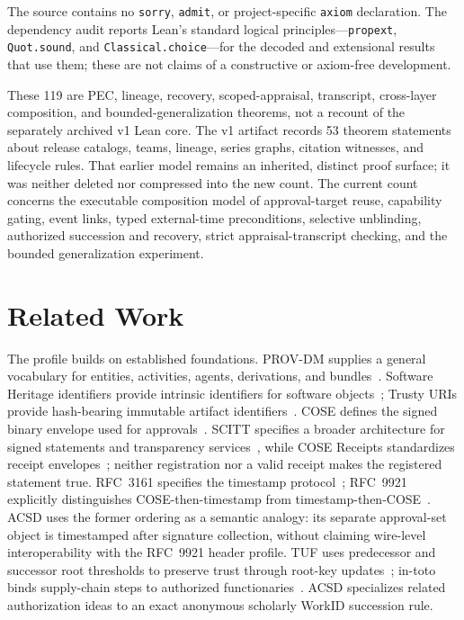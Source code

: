 \documentclass[acmsmall,screen,review,nonacm]{acmart}
\begin{document}
The source contains no \texttt{sorry}, \texttt{admit}, or project-specific
\texttt{axiom} declaration.  The dependency audit reports Lean's standard
logical principles---\texttt{propext}, \texttt{Quot.sound}, and
\texttt{Classical.choice}---for the decoded and extensional results that use
them; these are not claims of a constructive or axiom-free development.

These 119 are PEC, lineage, recovery, scoped-appraisal, transcript,
cross-layer composition, and bounded-generalization theorems, not a recount
of the separately archived v1 Lean core.
The v1 artifact records 53 theorem statements
about release catalogs, teams, lineage, series graphs, citation witnesses, and
lifecycle rules. That earlier model remains an inherited, distinct proof
surface; it was neither deleted nor compressed into the new count. The current
count concerns the executable composition model of approval-target reuse,
capability gating, event links, typed external-time preconditions, selective
unblinding, authorized succession and recovery, strict appraisal-transcript
checking, and the bounded generalization experiment.

\section{Related Work}

The profile builds on established foundations. PROV-DM supplies a general vocabulary for entities, activities, agents, derivations, and bundles~\cite{prov}. Software Heritage identifiers provide intrinsic identifiers for software objects~\cite{swhid}; Trusty URIs provide hash-bearing immutable artifact identifiers~\cite{trusty}. COSE defines the signed binary envelope used for approvals~\cite{cose}. SCITT specifies a broader architecture for signed statements and transparency services~\cite{scitt}, while COSE Receipts standardizes receipt envelopes~\cite{cosereceipts}; neither registration nor a valid receipt makes the registered statement true. RFC~3161 specifies the timestamp protocol~\cite{rfc3161}; RFC~9921 explicitly distinguishes COSE-then-timestamp from timestamp-then-COSE~\cite{rfc9921}. ACSD uses the former ordering as a semantic analogy: its separate approval-set object is timestamped after signature collection, without claiming wire-level interoperability with the RFC~9921 header profile. TUF uses predecessor and successor root thresholds to preserve trust through root-key updates~\cite{tufspec}; in-toto binds supply-chain steps to authorized functionaries~\cite{intoto}. ACSD specializes related authorization ideas to an exact anonymous scholarly WorkID succession rule.
\end{document}
